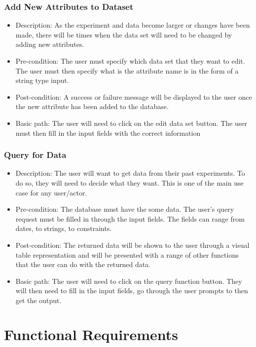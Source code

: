 \documentclass[12pt]{article}
\begin{document}
\subsubsection{Add New Attributes to Dataset}
\begin{itemize}
  \item Description: As the experiment and data become larger or changes have
  been made, there will be times when the data set will need to be changed by
  adding new attributes.  
  \item Pre-condition: The user must specify which data set that they want to
  edit. The user must then specify what is the attribute name is in the form of
  a string type input. 
  \item Post-condition: A success or failure message will be displayed to the
  user once the new attribute has been added to the database. 
  \item Basic path: The user will need to click on the edit data set button. The
  user must then fill in the input fields with the correct information
\end{itemize}

\subsubsection{Query for Data}
\begin{itemize}
  \item Description: The user will want to get data from their past experiments.
  To do so, they will need to decide what they want. This is one of the main use
  case for any user/actor. 
  \item Pre-condition: The database must have the some data. The user's query
  request must be filled in through the input fields. The fields can range from
  dates, to strings, to constraints. 
  \item Post-condition: The returned data will be shown to the user through a
  visual table representation and will be presented with a range of other
  functions that the user can do with the returned data.  
  \item Basic path: The user will need to click on the query function button.
  They will then need to fill in the input fields, go through the user prompts
  to then get the output.
\end{itemize}

\section{Functional Requirements}
\end{document}
